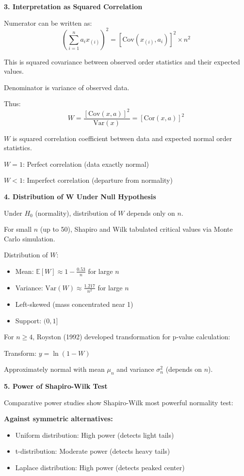 \documentclass[12pt]{article}
\begin{document}
\begin{explanation}
\textbf{3. Interpretation as Squared Correlation}

Numerator can be written as:
\[\left(\sum_{i=1}^{n} a_i x_{(i)}\right)^2 = \left[\text{Cov}(x_{(i)}, a_i)\right]^2 \times n^2\]

This is squared covariance between observed order statistics and their expected values.

Denominator is variance of observed data.

Thus:
\[W = \frac{[\text{Cov}(x, a)]^2}{\text{Var}(x)} = [\text{Cor}(x, a)]^2\]

$W$ is squared correlation coefficient between data and expected normal order statistics.

$W = 1$: Perfect correlation (data exactly normal)

$W < 1$: Imperfect correlation (departure from normality)

\textbf{4. Distribution of W Under Null Hypothesis}

Under $H_0$ (normality), distribution of $W$ depends only on $n$.

For small $n$ (up to 50), Shapiro and Wilk tabulated critical values via Monte Carlo simulation.

Distribution of $W$:
\begin{itemize}
\item Mean: $\mathbb{E}[W] \approx 1 - \frac{0.53}{n}$ for large $n$
\item Variance: $\text{Var}(W) \approx \frac{1.217}{n^2}$ for large $n$
\item Left-skewed (mass concentrated near 1)
\item Support: $(0, 1]$
\end{itemize}

For $n \geq 4$, Royston (1992) developed transformation for p-value calculation:

Transform: $y = \ln(1 - W)$

Approximately normal with mean $\mu_n$ and variance $\sigma_n^2$ (depends on $n$).

\textbf{5. Power of Shapiro-Wilk Test}

Comparative power studies show Shapiro-Wilk most powerful normality test:

\textbf{Against symmetric alternatives:}
\begin{itemize}
\item Uniform distribution: High power (detects light tails)
\item t-distribution: Moderate power (detects heavy tails)
\item Laplace distribution: High power (detects peaked center)
\end{itemize}


\end{explanation}
\end{document}
